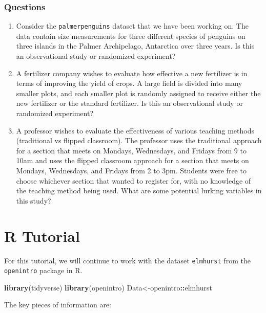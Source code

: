 \documentclass[
]{book}
\newenvironment{Shaded}{\begin{snugshade}}{\end{snugshade}}
\newcommand{\FunctionTok}[1]{\textcolor[rgb]{0.13,0.29,0.53}{\textbf{#1}}}
\newcommand{\NormalTok}[1]{#1}
\newcommand{\OtherTok}[1]{\textcolor[rgb]{0.56,0.35,0.01}{#1}}
\newcommand{\SpecialCharTok}[1]{\textcolor[rgb]{0.81,0.36,0.00}{\textbf{#1}}}
\begin{document}
\subsubsection{Questions}\label{questions-1}

\begin{enumerate}
\def\labelenumi{\arabic{enumi}.}
\item
  Consider the \texttt{palmerpenguins} dataset that we have been working on. The data contain size measurements for three different species of penguins on three islands in the Palmer Archipelago, Antarctica over three years. Is this an observational study or randomized experiment?
\item
  A fertilizer company wishes to evaluate how effective a new fertilizer is in terms of improving the yield of crops. A large field is divided into many smaller plots, and each smaller plot is randomly assigned to receive either the new fertilizer or the standard fertilizer. Is this an observational study or randomized experiment?
\item
  A professor wishes to evaluate the effectiveness of various teaching methods (traditional vs flipped classroom). The professor uses the traditional approach for a section that meets on Mondays, Wednesdays, and Fridays from 9 to 10am and uses the flipped classroom approach for a section that meets on Mondays, Wednesdays, and Fridays from 2 to 3pm. Students were free to choose whichever section that wanted to register for, with no knowledge of the teaching method being used. What are some potential lurking variables in this study?
\end{enumerate}

\section{R Tutorial}\label{r-tutorial-1}

For this tutorial, we will continue to work with the dataset \texttt{elmhurst} from the \texttt{openintro} package in R.

\begin{Shaded}
\begin{Highlighting}[]
\FunctionTok{library}\NormalTok{(tidyverse)}
\FunctionTok{library}\NormalTok{(openintro)}
\NormalTok{Data}\OtherTok{\textless{}{-}}\NormalTok{openintro}\SpecialCharTok{::}\NormalTok{elmhurst}
\end{Highlighting}
\end{Shaded}

The key pieces of information are:
\end{document}
